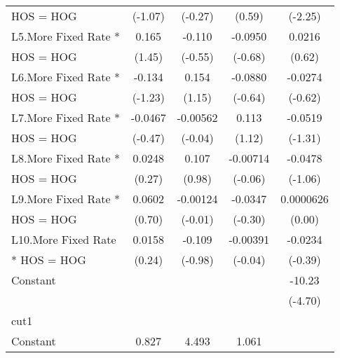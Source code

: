 {\begin{tabular}{l*{4}{c}}
HOS = HOG           &     (-1.07)         &     (-0.27)         &      (0.59)         &     (-2.25)         \\
[1em]
L5.More Fixed Rate *&       0.165         &      -0.110         &     -0.0950         &      0.0216         \\
HOS = HOG           &      (1.45)         &     (-0.55)         &     (-0.68)         &      (0.62)         \\
[1em]
L6.More Fixed Rate *&      -0.134         &       0.154         &     -0.0880         &     -0.0274         \\
HOS = HOG           &     (-1.23)         &      (1.15)         &     (-0.64)         &     (-0.62)         \\
[1em]
L7.More Fixed Rate *&     -0.0467         &    -0.00562         &       0.113         &     -0.0519         \\
HOS = HOG           &     (-0.47)         &     (-0.04)         &      (1.12)         &     (-1.31)         \\
[1em]
L8.More Fixed Rate *&      0.0248         &       0.107         &    -0.00714         &     -0.0478         \\
HOS = HOG           &      (0.27)         &      (0.98)         &     (-0.06)         &     (-1.06)         \\
[1em]
L9.More Fixed Rate *&      0.0602         &    -0.00124         &     -0.0347         &   0.0000626         \\
HOS = HOG           &      (0.70)         &     (-0.01)         &     (-0.30)         &      (0.00)         \\
[1em]
L10.More Fixed Rate &      0.0158         &      -0.109         &    -0.00391         &     -0.0234         \\
* HOS = HOG         &      (0.24)         &     (-0.98)         &     (-0.04)         &     (-0.39)         \\
[1em]
Constant            &                     &                     &                     &      -10.23\sym{***}\\
                    &                     &                     &                     &     (-4.70)         \\
\hline
cut1                &                     &                     &                     &                     \\
Constant            &       0.827\sym{*}  &       4.493\sym{***}&       1.061\sym{**} &                     \\

\end{tabular}}
